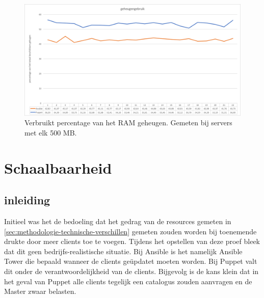 \begin{figure}
  \includegraphics[width=\linewidth]{img/geheugengebruik}
 \caption{Verbruikt percentage van het RAM geheugen. Gemeten bij servers met elk 500 MB. }  
  \label{fig:geheugengebruik}
\end{figure}


\section{Schaalbaarheid}
\label{sec:schaalbaarheid}

\subsection{inleiding}
\label{sec:inleiding}
 Initieel was het de bedoeling dat het gedrag van de resources gemeten in \ref{sec:methodologie-technische-verschillen} gemeten zouden worden bij toenemende drukte door meer clients toe te voegen. Tijdens het opstellen van deze proef bleek dat dit geen bedrijfs-realistische situatie. Bij Ansible is het namelijk Ansible Tower die bepaald wanneer de clients ge\"updatet moeten worden. Bij Puppet valt dit onder de verantwoordelijkheid van de clients. Bijgevolg is de kans klein dat in het geval van Puppet alle clients tegelijk een catalogus zouden aanvragen en de Master zwaar belasten. 
 
